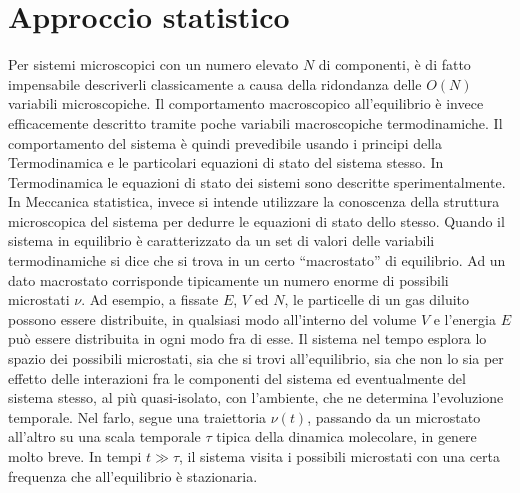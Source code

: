 \section{Approccio statistico}
Per sistemi microscopici con un numero elevato $N$ di componenti, è di fatto impensabile descriverli classicamente a causa della ridondanza delle $O(N)$ variabili microscopiche. Il comportamento macroscopico all'equilibrio è invece efficacemente descritto tramite poche variabili macroscopiche termodinamiche. Il comportamento del sistema è quindi prevedibile usando i principi della Termodinamica e le particolari equazioni di stato del sistema stesso. In Termodinamica le equazioni di stato dei sistemi sono descritte sperimentalmente. In Meccanica statistica, invece si intende utilizzare la conoscenza della struttura microscopica del sistema per dedurre le equazioni di stato dello stesso. Quando il sistema in equilibrio è caratterizzato da un set di valori delle variabili termodinamiche si dice che si trova in un certo ``macrostato'' di equilibrio. Ad un dato macrostato corrisponde tipicamente un numero enorme di possibili microstati $\nu$. Ad esempio, a fissate $E$, $V$ ed $N$, le particelle di un gas diluito possono essere distribuite, in qualsiasi modo all'interno del volume $V$ e l'energia $E$ può essere distribuita in ogni modo fra di esse. Il sistema nel tempo esplora lo spazio dei possibili microstati, sia che si trovi all'equilibrio, sia che non lo sia per effetto delle interazioni fra le componenti del sistema ed eventualmente del sistema stesso, al più quasi-isolato, con l'ambiente, che ne determina l'evoluzione temporale. Nel farlo, segue una traiettoria $\nu(t)$, passando da un microstato all'altro su una scala temporale $\tau$ tipica della dinamica molecolare, in genere molto breve. In tempi $t \gg \tau$, il sistema visita i possibili microstati con una certa frequenza che all'equilibrio è stazionaria.

